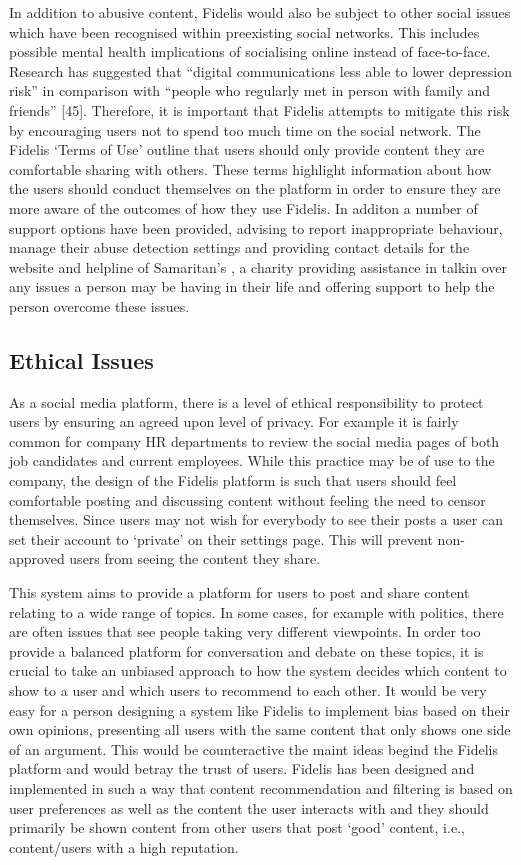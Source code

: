 In addition to abusive content, Fidelis would also be subject to other social issues which have been recognised within preexisting social networks. This includes possible mental health implications of socialising online instead of face-to-face. Research has suggested that ``digital communications less able to lower depression risk'' in comparison with ``people who regularly met in person with family and friends'' [45]. Therefore, it is important that Fidelis attempts to mitigate this risk by encouraging users not to spend too much time on the social network. The Fidelis `Terms of Use' outline that users should only provide content they are comfortable sharing with others. These terms highlight information about how the users should conduct themselves on the platform in order to ensure they are more aware of the outcomes of how they use Fidelis. In additon a number of support options have been provided, advising to report inappropriate behaviour, manage their abuse detection settings and providing contact details for the website and helpline of Samaritan's \cite{Samaritans:Home}, a charity providing assistance in talkin over any issues a person may be having in their life and offering support to help the person overcome these issues.

\subsection{Ethical Issues}
As a social media platform, there is a level of ethical responsibility to protect users by ensuring an agreed upon level of privacy. For example it is fairly common for company HR departments to review the social media pages of both job candidates and current employees. While this practice may be of use to the company, the design of the Fidelis platform is such that users should feel comfortable posting and discussing content without feeling the need to censor themselves. Since users may not wish for everybody to see their posts a user can set their account to `private' on their settings page. This will prevent non-approved users from seeing the content they share.

This system aims to provide a platform for users to post and share content relating to a wide range of topics. In some cases, for example with politics, there are often issues that see people taking very different viewpoints. In order too provide a balanced platform for conversation and debate on these topics, it is crucial to take an unbiased approach to how the system decides which content to show to a user and which users to recommend to each other. It would be very easy for a person designing a system like Fidelis to implement bias based on their own opinions, presenting all users with the same content that only shows one side of an argument. This would be counteractive the maint ideas begind the Fidelis platform and would betray the trust of users. Fidelis has been designed and implemented in such a way that content recommendation and filtering is based on user preferences as well as the content the user interacts with and they should primarily be shown content from other users that post `good' content, i.e., content/users with a high reputation.

